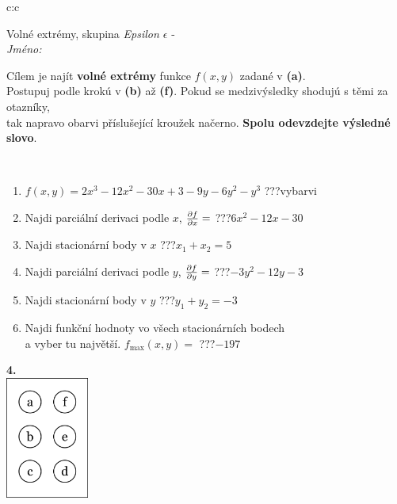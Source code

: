\documentclass[10pt]{report}
\begin{document}
\begin{tabular}{c:c}
\begin{minipage}[c][104.5mm][t]{0.5\linewidth}
\begin{center}
\vspace{7mm}
{\huge Volné extrémy, skupina \textit{Epsilon $\epsilon$} -}\\[5mm]
\textit{Jméno:}\phantom{xxxxxxxxxxxxxxxxxxxxxxxxxxxxxxxxxxxxxxxxxxxxxxxxxxxxxxxxxxxxxxxxx}\\[5mm]
\begin{minipage}{0.95\linewidth}
\begin{center}
Cílem je najít \textbf{volné extrémy} funkce $f(x,y)$ zadané v \textbf{(a)}.\\Postupuj podle krokú v \textbf{(b)} až \textbf{(f)}. Pokud se medzivýsledky shodujú s těmi za otazníky,\\tak napravo obarvi příslušející kroužek načerno. \textbf{Spolu odevzdejte výsledné slovo}.
\end{center}
\end{minipage}
\\[1mm]
\begin{minipage}{0.79\linewidth}
\begin{center}
\begin{varwidth}{\linewidth}
\begin{enumerate}
\normalsize
\item $f(x,y)=2x^3-12x^2-30x+3-9y-6y^2-y^3$\quad \dotfill\; ???\;\dotfill \quad vybarvi
\item Najdi parciální derivaci podle $x$, $\pdv{f}{x}=$\quad \dotfill\; ???\;\dotfill \quad $6x^2-12x-30$
\item Najdi stacionární body v $x$\quad \dotfill\; ???\;\dotfill \quad $x_1+x_2=5$
\item Najdi parciální derivaci podle $y$, $\pdv{f}{y}=$\quad \dotfill\; ???\;\dotfill \quad $-3y^2-12y-3$
\item Najdi stacionární body v $y$\quad \dotfill\; ???\;\dotfill \quad $y_1+y_2=-3$
\item Najdi funkční hodnoty vo všech stacionárních bodech \\ \phantom{xxxxxx} a vyber tu najvětší. $f_{\text{max}}(x,y)=$\quad \dotfill\; ???\;\dotfill \quad $-197$
\end{enumerate}
\end{varwidth}
\end{center}
\end{minipage}
\begin{minipage}{0.20\linewidth}
\begin{center}
{\Huge\bfseries 4.} \\[2mm]
\includegraphics[height=40mm]{../images/braille.png}

\end{center}
\end{minipage}
\end{center}
\end{minipage}
\end{tabular}
\end{document}
